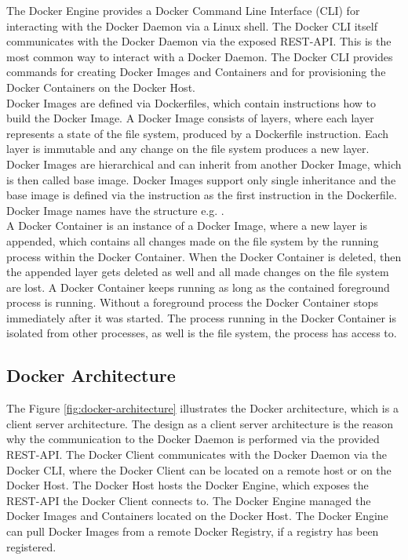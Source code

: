\label{sec:docker-cli}
The Docker Engine provides a Docker Command Line Interface (CLI) for interacting with the Docker Daemon via a Linux shell. The Docker CLI itself communicates with the Docker Daemon via the exposed REST-API. This is the most common way to interact with a Docker Daemon. The Docker CLI provides commands for creating Docker Images and Containers and for provisioning the Docker Containers on the Docker Host. \\

\label{sec:docker-images}
Docker Images are defined via Dockerfiles, which contain instructions how to build the Docker Image. A Docker Image consists of layers, where each layer represents a state of the file system, produced by a Dockerfile instruction. Each layer is immutable and any change on the file system produces a new layer. Docker Images are hierarchical and can inherit from another Docker Image, which is then called base image. Docker Images support only single inheritance and the base image is defined via the  instruction as the first instruction in the Dockerfile. Docker Image names have the structure \mentionedtext{[namespace]/[name]:[version]} e.g. . \\

\label{sec:docker-containers}
A Docker Container is an instance of a Docker Image, where a new layer is appended, which contains all changes made on the file system by the running process within the Docker Container. When the Docker Container is deleted, then the appended layer gets deleted as well and all made changes on the file system are lost. A Docker Container keeps running as long as the contained foreground process is running. Without a foreground process the Docker Container stops immediately after it was started. The process running in the Docker Container is isolated from other processes, as well is the file system, the process has access to. \\

\subsection{Docker Architecture}
\label{sec:docker-architecture}
The Figure \vref{fig:docker-architecture} illustrates the Docker architecture, which is a client server architecture. The design as a client server architecture is the reason why the communication to the Docker Daemon is performed via the provided REST-API. The Docker Client communicates with the Docker Daemon via the Docker CLI, where the Docker Client can be located on a remote host or on the Docker Host. The Docker Host hosts the Docker Engine, which exposes the REST-API the Docker Client connects to. The Docker Engine managed the Docker Images and Containers located on the Docker Host. The Docker Engine can pull Docker Images from a remote Docker Registry, if a registry has been registered.

